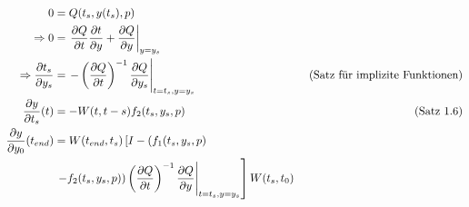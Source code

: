 \begin{align*}
0 &= Q(t_s,y(t_s),p) \\
\Rightarrow 0&= \left. \frac{\partial Q}{\partial t} \frac{\partial t}{\partial y} + \frac{\partial Q}{\partial y} \right|_{y=y_s} \\
\Rightarrow \frac{\partial t_s}{\partial y_s} &= \left. - \left(\frac{\partial Q}{\partial t} \right)^{-1} \frac{\partial Q}{\partial y_s}\right|_{t=t_s, y=y_s} & \text{ (Satz für implizite Funktionen)} \\
\frac{\partial y}{\partial t_s}(t) &= - W(t,t-s) f_2(t_s,y_s,p) & \text{ (Satz 1.6)} \\
\frac{\partial y}{\partial y_0} (t_{end}) &= W(t_{end}, t_s) \left[I - (f_1(t_s,y_s,p) \right. \\
& \left. \left. -f_2(t_s,y_s,p)) \left( \frac{\partial Q}{\partial t}\right)^{-1} \frac{\partial Q}{\partial y} \right|_{t=t_s, y=y_s} \right] W(t_s,t_0)
\end{align*}














